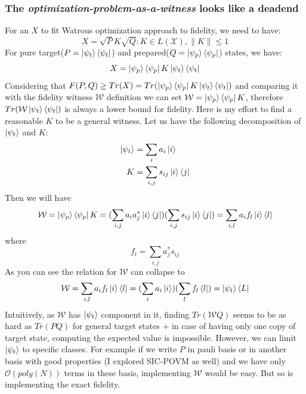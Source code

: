 \documentclass[11pt]{article}
\begin{document}
\subsubsection{The \textit{optimization-problem-as-a-witness} looks like a deadend}
\label{sec:fidelity-deadend}
For an $X$ to fit Watrous optimization approach to fidelity, we need to have:
$$
X = \sqrt{P}K\sqrt{Q}: K \in L(\mathcal{X}),  \lVert K \rVert \le 1
$$
For pure target($P=\ket{\psi_t}\bra{\psi_t}$) and prepared($Q=\ket{\psi_p}\bra{\psi_p}$) states, we have:
$$
X = \ket{\psi_p}\bra{\psi_p}K\ket{\psi_t}\bra{\psi_t}
$$
Considering that $F(P, Q) \ge Tr(X) = Tr(\ket{\psi_p}\bra{\psi_p}K\ket{\psi_t}\bra{\psi_t})$ and comparing it with the fidelity witness $\mathcal{W}$ definition we can set $\mathcal{W} = \ket{\psi_p}\bra{\psi_p}K$, therefore $Tr(\mathcal{W}\ket{\psi_t}\bra{\psi_t})$ is always a lower bound for fidelity. Here is my effort to find a reasonable $K$ to be a general witness. Let us have the following decomposition of $\ket{\psi_t}$ and $K$:
\begin{align*}
\ket{\psi_t} &= \sum_i{a_i\ket{i}} \\
K &= \sum_{i,j}s_{ij}\ket{i}\bra{j}
\end{align*}
Then we will have
$$
\mathcal{W} = \ket{\psi_p}\bra{\psi_p}K = (\sum_{i,j}a_ia_j^*\ket{i}\bra{j})(\sum_{i,j}s_{ij}\ket{i}\bra{j}) = \sum_{i,l}a_if_l\ket{i}\bra{l}
$$
where 
$$
f_l = \sum_{i,j}a_j^*s_{ij}
$$
As you can see the relation for $\mathcal{W}$ can collapse to 
$$
\mathcal{W} = \sum_{i,l}a_if_l\ket{i}\bra{l} = (\sum_i{a_i\ket{i}})(\sum_l{f_l\bra{l}}) = \ket{\psi_t}\bra{L}
$$
Intuitively, as $\mathcal{W}$ has $\ket{\psi_t}$ component in it, finding $Tr(\mathcal{W}Q)$ seems to be as hard as $Tr(PQ)$ for general target states + in case of having only one copy of target state, computing the expected value is impossible. However, we can limit $\ket{\psi_t}$ to specific classes. For example if we write $P$ in pauli basis or in another basis with good properties (I explored SIC-POVM as well) and we have only $\mathcal{O}(poly(N))$ terms in these basis, implementing $\mathcal{W}$ would be easy. But so is implementing the exact fidelity. 
\end{document}
